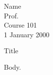 \documentclass[12pt, letterpaper]{article}
\begin{document}
{\setlength{\parindent}{0cm}
    Name \\
    Prof. \\
    Course 101 \\
    1 January 2000
}
\begin{center}
    Title
\end{center}\par

Body.

\end{document}
